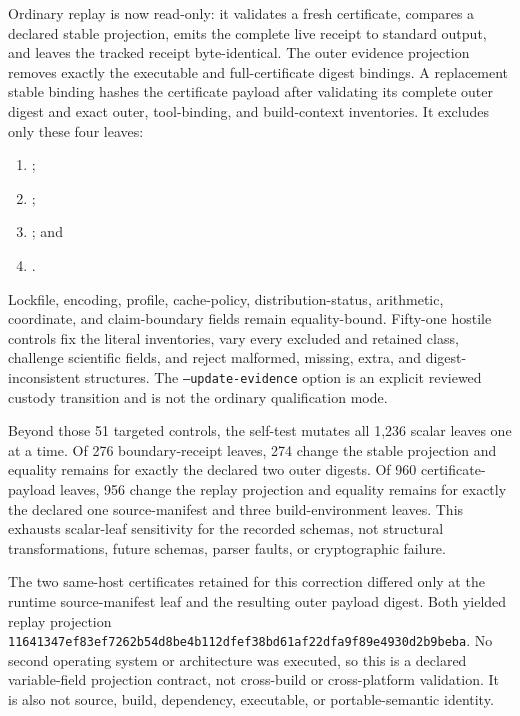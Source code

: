 \documentclass[11pt]{article}
\theoremstyle{definition}
\begin{document}
Ordinary replay is now read-only: it validates a fresh certificate, compares a declared stable
projection, emits the complete live receipt to standard output, and leaves the tracked receipt
byte-identical.  The outer evidence projection removes exactly the executable and
full-certificate digest bindings.  A replacement stable binding hashes the certificate payload
after validating its complete outer digest and exact outer, tool-binding, and build-context
inventories.  It excludes only these four leaves:
\begin{enumerate}[leftmargin=*]
  \item {};
  \item {};
  \item {}; and
  \item {}.
\end{enumerate}
Lockfile, encoding, profile, cache-policy, distribution-status, arithmetic, coordinate, and
claim-boundary fields remain equality-bound.  Fifty-one hostile controls fix the literal
inventories, vary every excluded and retained class, challenge scientific fields, and reject
malformed, missing, extra, and digest-inconsistent structures.  The
\texttt{--update-evidence} option is an explicit reviewed custody transition and is not the
ordinary qualification mode.

Beyond those 51 targeted controls, the self-test mutates all 1,236 scalar leaves one at a time.
Of 276 boundary-receipt leaves, 274 change the stable projection and equality remains for exactly
the declared two outer digests.  Of 960 certificate-payload leaves, 956 change the replay
projection and equality remains for exactly the declared one source-manifest and three
build-environment leaves.  This exhausts scalar-leaf sensitivity for the recorded schemas, not
structural transformations, future schemas, parser faults, or cryptographic failure.

The two same-host certificates retained for this correction differed only at the runtime
source-manifest leaf and the resulting outer payload digest.  Both yielded replay projection
\texttt{11641347ef83ef7262b54d8be4b112dfef38bd61af22dfa9f89e4930d2b9beba}.
No second operating system or architecture was executed, so this is a declared variable-field
projection contract, not cross-build or cross-platform validation.  It is also not source,
build, dependency, executable, or portable-semantic identity.
\end{document}
